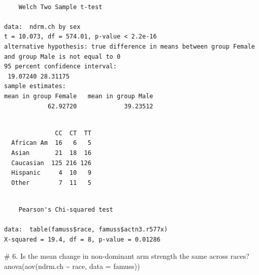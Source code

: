 \documentclass[
  letterpaper,
  DIV=11,
  numbers=noendperiod,
  oneside]{scrreprt}
\newenvironment{Shaded}{\begin{snugshade}}{\end{snugshade}}
\newcommand{\AttributeTok}[1]{\textcolor[rgb]{0.40,0.45,0.13}{#1}}
\newcommand{\CommentTok}[1]{\textcolor[rgb]{0.37,0.37,0.37}{#1}}
\newcommand{\FunctionTok}[1]{\textcolor[rgb]{0.28,0.35,0.67}{#1}}
\newcommand{\NormalTok}[1]{\textcolor[rgb]{0.00,0.23,0.31}{#1}}
\newcommand{\SpecialCharTok}[1]{\textcolor[rgb]{0.37,0.37,0.37}{#1}}
\begin{document}
\begin{verbatim}

    Welch Two Sample t-test

data:  ndrm.ch by sex
t = 10.073, df = 574.01, p-value < 2.2e-16
alternative hypothesis: true difference in means between group Female and group Male is not equal to 0
95 percent confidence interval:
 19.07240 28.31175
sample estimates:
mean in group Female   mean in group Male 
            62.92720             39.23512 
\end{verbatim}

\begin{Shaded}
\end{Shaded}

\begin{verbatim}
            
              CC  CT  TT
  African Am  16   6   5
  Asian       21  18  16
  Caucasian  125 216 126
  Hispanic     4  10   9
  Other        7  11   5
\end{verbatim}

\begin{Shaded}
\end{Shaded}

\begin{verbatim}

    Pearson's Chi-squared test

data:  table(famuss$race, famuss$actn3.r577x)
X-squared = 19.4, df = 8, p-value = 0.01286
\end{verbatim}

\begin{Shaded}
\begin{Highlighting}[]
\CommentTok{\# 6. Is the mean change in non{-}dominant arm strength the same across races?}
\FunctionTok{anova}\NormalTok{(}\FunctionTok{aov}\NormalTok{(ndrm.ch }\SpecialCharTok{\textasciitilde{}}\NormalTok{ race, }\AttributeTok{data =}\NormalTok{ famuss))}
\end{Highlighting}
\end{Shaded}
\end{document}
